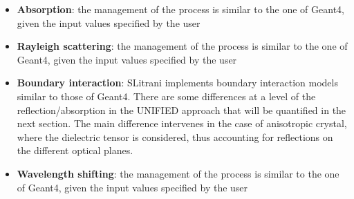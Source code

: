 \begin{itemize}
\item \textbf{Absorption}: the management of the process is similar to the one of Geant4, given the input values specified by the user
\item \textbf{Rayleigh scattering}: the management of the process is similar to the one of Geant4, given the input values specified by the user
\item \textbf{Boundary interaction}: SLitrani implements boundary interaction models similar to those of Geant4. There are some differences at a level of the reflection/absorption in the UNIFIED approach that will be quantified in the next section.
The main difference intervenes in the case of anisotropic crystal, where the dielectric tensor is considered, thus accounting for reflections on the different optical planes.
\item \textbf{Wavelength shifting}: the management of the process is similar to the one of Geant4, given the input values specified by the user
\end{itemize}


